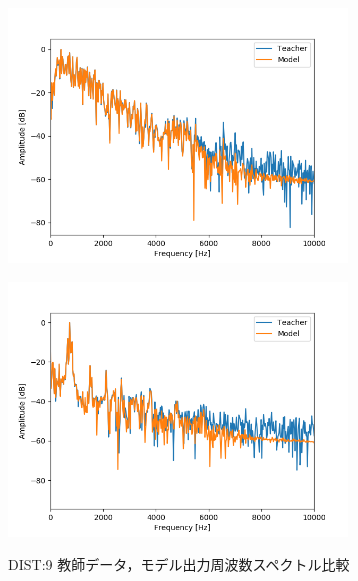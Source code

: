 \documentclass{jreport}		%
\begin{document}
\begin{figure}[htbp]
 \begin{minipage}{0.5\hsize}
 \begin{center}
  \includegraphics[width=90mm]{gain10_fft_hikaku.png}
 \end{center}
 \label{fig:one}
 \end{minipage}
 \begin{minipage}{0.5\hsize}
 \begin{center}
  \includegraphics[width=90mm]{gain10_fft_hikaku2.png}
 \end{center}
 \label{fig:two}
 \end{minipage}
 \caption{DIST:9 教師データ，モデル出力周波数スペクトル比較}
\end{figure}
\end{document}
